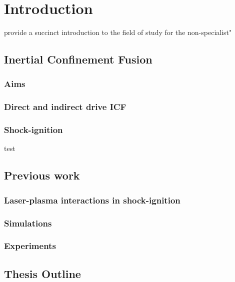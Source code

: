 \chapter{Introduction}
\label{chp:introduction}
provide a succinct introduction to the field of study for the non-specialist"

\section{Inertial Confinement Fusion}
\subsection{Aims}
\subsection{Direct and indirect drive ICF}
\subsection{Shock-ignition}
test\cite{Rib2009}


\section{Previous work}
\subsection{Laser-plasma interactions in shock-ignition}
\subsection{Simulations}
\subsection{Experiments}

\section{Thesis Outline}



